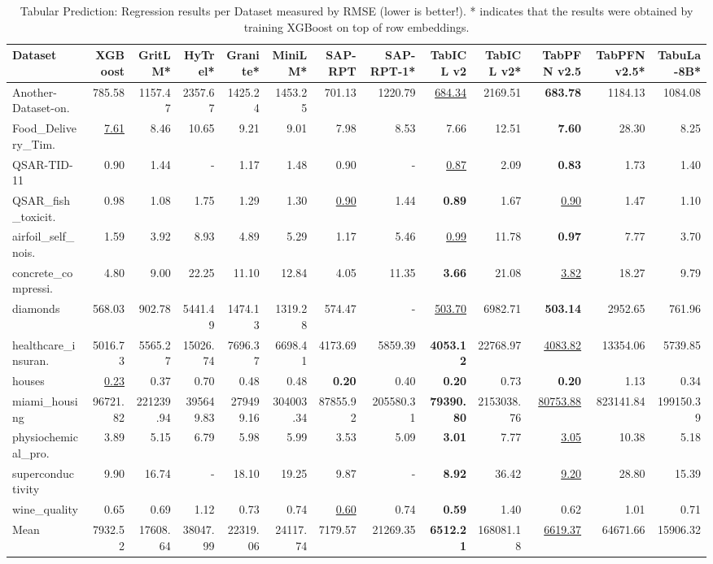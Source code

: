 \begin{table}[t]
\footnotesize
\centering
\begin{tabular*}{\textwidth}{@{\extracolsep{\fill}} l r r r r r r r r r r r r @{{}}}
\hline
Dataset & XGBoost & GritLM* & HyTrel* & Granite* & MiniLM* & SAP-RPT & SAP-RPT-1* & TabICL v2 & TabICL v2* & TabPFN v2.5 & TabPFN v2.5* & TabuLa-8B* \\
\hline
Another-Dataset-on. & 785.58 & 1157.47 & 2357.67 & 1425.24 & 1453.25 & 701.13 & 1220.79 & \underline{684.34} & 2169.51 & \textbf{683.78} & 1184.13 & 1084.08 \\
Food\_Delivery\_Tim. & \underline{7.61} & 8.46 & 10.65 & 9.21 & 9.01 & 7.98 & 8.53 & 7.66 & 12.51 & \textbf{7.60} & 28.30 & 8.25 \\
QSAR-TID-11 & 0.90 & 1.44 & - & 1.17 & 1.48 & 0.90 & - & \underline{0.87} & 2.09 & \textbf{0.83} & 1.73 & 1.40 \\
QSAR\_fish\_toxicit. & 0.98 & 1.08 & 1.75 & 1.29 & 1.30 & \underline{0.90} & 1.44 & \textbf{0.89} & 1.67 & \underline{0.90} & 1.47 & 1.10 \\
airfoil\_self\_nois. & 1.59 & 3.92 & 8.93 & 4.89 & 5.29 & 1.17 & 5.46 & \underline{0.99} & 11.78 & \textbf{0.97} & 7.77 & 3.70 \\
concrete\_compressi. & 4.80 & 9.00 & 22.25 & 11.10 & 12.84 & 4.05 & 11.35 & \textbf{3.66} & 21.08 & \underline{3.82} & 18.27 & 9.79 \\
diamonds & 568.03 & 902.78 & 5441.49 & 1474.13 & 1319.28 & 574.47 & - & \underline{503.70} & 6982.71 & \textbf{503.14} & 2952.65 & 761.96 \\
healthcare\_insuran. & 5016.73 & 5565.27 & 15026.74 & 7696.37 & 6698.41 & 4173.69 & 5859.39 & \textbf{4053.12} & 22768.97 & \underline{4083.82} & 13354.06 & 5739.85 \\
houses & \underline{0.23} & 0.37 & 0.70 & 0.48 & 0.48 & \textbf{0.20} & 0.40 & \textbf{0.20} & 0.73 & \textbf{0.20} & 1.13 & 0.34 \\
miami\_housing & 96721.82 & 221239.94 & 395649.83 & 279499.16 & 304003.34 & 87855.92 & 205580.31 & \textbf{79390.80} & 2153038.76 & \underline{80753.88} & 823141.84 & 199150.39 \\
physiochemical\_pro. & 3.89 & 5.15 & 6.79 & 5.98 & 5.99 & 3.53 & 5.09 & \textbf{3.01} & 7.77 & \underline{3.05} & 10.38 & 5.18 \\
superconductivity & 9.90 & 16.74 & - & 18.10 & 19.25 & 9.87 & - & \textbf{8.92} & 36.42 & \underline{9.20} & 28.80 & 15.39 \\
wine\_quality & 0.65 & 0.69 & 1.12 & 0.73 & 0.74 & \underline{0.60} & 0.74 & \textbf{0.59} & 1.40 & 0.62 & 1.01 & 0.71 \\
Mean & 7932.52 & 17608.64 & 38047.99 & 22319.06 & 24117.74 & 7179.57 & 21269.35 & \textbf{6512.21} & 168081.18 & \underline{6619.37} & 64671.66 & 15906.32 \\
\hline
\end{tabular*}
\caption{Tabular Prediction: Regression results per Dataset measured by RMSE (lower is better!). * indicates that the results were obtained by training XGBoost on top of row embeddings.}
\label{tab:tabular_prediction_regression}
\end{table}
